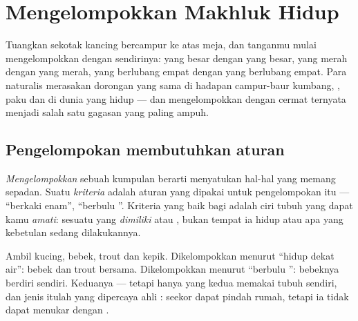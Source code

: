 \chapter{Mengelompokkan Makhluk Hidup}\label{ch:g3:sorting-living-things}

Tuangkan sekotak kancing bercampur ke atas meja, dan tanganmu mulai
mengelompokkan dengan sendirinya: yang besar dengan yang besar, yang
merah dengan yang merah, yang berlubang empat dengan yang berlubang
empat. Para naturalis merasakan dorongan yang sama di hadapan
campur-baur kumbang, ,  paku dan  di dunia yang
hidup --- dan mengelompokkan  dengan cermat ternyata
menjadi salah satu gagasan  yang paling ampuh.

\section{Pengelompokan membutuhkan aturan}

\begin{definition}\label{def:g3:sorting-living-things:criterion}
\emph{Mengelompokkan} sebuah kumpulan berarti
menyatukan hal-hal yang memang sepadan. Suatu
\emph{kriteria} adalah aturan yang dipakai untuk
pengelompokan itu --- ``berkaki enam'', ``berbulu ''. Kriteria
yang baik bagi  adalah ciri tubuh yang dapat kamu
\emph{amati}: sesuatu yang \emph{dimiliki}  atau ,
bukan tempat ia hidup atau apa yang kebetulan sedang dilakukannya.
\end{definition}

\begin{example}\label{ex:g3:sorting-living-things:two}
Ambil kucing, bebek,  trout dan kepik. Dikelompokkan menurut
``hidup dekat air'': bebek dan  trout bersama. Dikelompokkan
menurut ``berbulu '': bebeknya berdiri sendiri. Keduanya
 --- tetapi hanya yang kedua memakai tubuh 
sendiri, dan jenis itulah yang dipercaya ahli : seekor 
dapat pindah rumah, tetapi ia tidak dapat menukar 
dengan .
\end{example}

